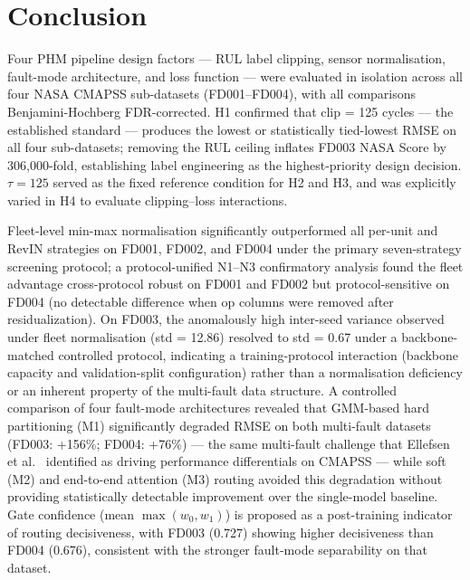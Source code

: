 \documentclass[review,12pt]{elsarticle}
\begin{document}
\section{Conclusion}

Four PHM pipeline design factors — RUL label clipping, sensor normalisation, fault-mode architecture, and loss function — were evaluated in isolation across all four NASA CMAPSS sub-datasets (FD001–FD004), with all comparisons Benjamini-Hochberg FDR-corrected. H1 confirmed that clip = 125 cycles — the established standard \cite{ref05,ref06} — produces the lowest or statistically tied-lowest RMSE on all four sub-datasets; removing the RUL ceiling inflates FD003 NASA Score by 306,000-fold, establishing label engineering as the highest-priority design decision. $\tau = 125$ served as the fixed reference condition for H2 and H3, and was explicitly varied in H4 to evaluate clipping--loss interactions.

Fleet-level min-max normalisation significantly outperformed all per-unit and RevIN strategies on FD001, FD002, and FD004 under the primary seven-strategy screening protocol; a protocol-unified N1--N3 confirmatory analysis found the fleet advantage cross-protocol robust on FD001 and FD002 but protocol-sensitive on FD004 (no detectable difference when op columns were removed after residualization). On FD003, the anomalously high inter-seed variance observed under fleet normalisation (std = 12.86) resolved to std = 0.67 under a backbone-matched controlled protocol, indicating a training-protocol interaction (backbone capacity and validation-split configuration) rather than a normalisation deficiency or an inherent property of the multi-fault data structure. A controlled comparison of four fault-mode architectures revealed that GMM-based hard partitioning (M1) significantly degraded RMSE on both multi-fault datasets (FD003: +156\%; FD004: +76\%) --- the same multi-fault challenge that Ellefsen et al.~\cite{ref07} identified as driving performance differentials on CMAPSS --- while soft (M2) and end-to-end attention (M3) routing avoided this degradation without providing statistically detectable improvement over the single-model baseline. Gate confidence (mean $\max(w_0, w_1)$) is proposed as a post-training indicator of routing decisiveness, with FD003 (0.727) showing higher decisiveness than FD004 (0.676), consistent with the stronger fault-mode separability on that dataset.
\end{document}
